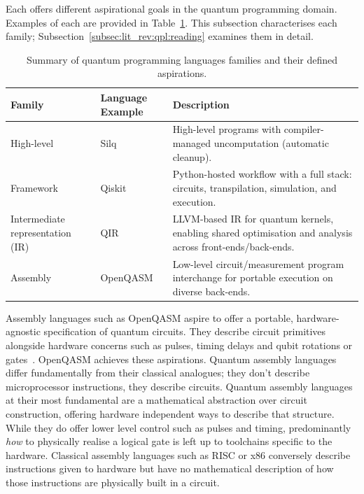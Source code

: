 Each offers different aspirational goals in the quantum programming domain.
Examples of each are provided in Table~\ref{tab:lit_rev:qpl:language_family_taxonomy}.
This subsection characterises each family; Subsection~\ref{subsec:lit_rev:qpl:reading} examines them in detail.
\begin{table}[htbp]
    \centering
    \caption{Summary of quantum programming languages families and their defined aspirations.}
    \label{tab:lit_rev:qpl:language_family_taxonomy}
    \begin{tabularx}{\textwidth}{@{}>{\hsize=0.2\hsize}X>{\hsize=0.2\hsize}X>{\hsize=0.6\hsize}X@{}}
		\toprule
        \textbf{Family} & \textbf{Language Example} & \textbf{Description} \\ \midrule
        High-level & Silq & High-level programs with compiler-managed uncomputation (automatic cleanup). \\
        Framework & Qiskit & Python-hosted workflow with a full stack: circuits, transpilation, simulation, and execution. \\
        Intermediate representation (IR) & QIR & LLVM-based IR for quantum kernels, enabling shared optimisation and analysis across front-ends/back-ends. \\
        Assembly & OpenQASM & Low-level circuit/measurement program interchange for portable execution on diverse back-ends. \\
        \bottomrule
    \end{tabularx}
\end{table}

Assembly languages such as OpenQASM aspire to offer a portable, hardware-agnostic specification of quantum circuits.
They describe circuit primitives alongside hardware concerns such as pulses, timing delays and qubit rotations or gates~\cite{cross2022openqasm3}.
OpenQASM achieves these aspirations.
Quantum assembly languages differ fundamentally from their classical analogues; they don't describe microprocessor instructions, they describe circuits.
Quantum assembly languages at their most fundamental are a mathematical abstraction over circuit construction, offering hardware independent ways to describe that structure.
While they do offer lower level control such as pulses and timing, predominantly \textit{how} to physically realise a logical gate is left up to toolchains specific to the hardware.
Classical assembly languages such as RISC or x86 conversely describe instructions given to hardware but have no mathematical description of how those instructions are physically built in a circuit.

